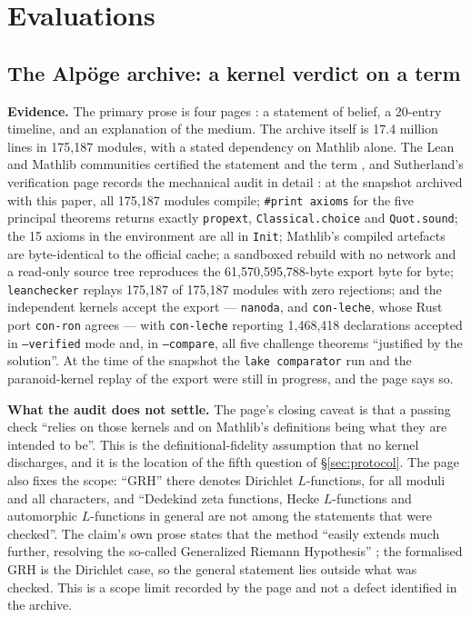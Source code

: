 \documentclass[11pt,a4paper]{article}
\begin{document}
\section{Evaluations}
\label{sec:evaluations}

\subsection{The Alp\"oge archive: a kernel verdict on a term}
\label{sec:alpoge}

\textbf{Evidence.} The primary prose is four pages \cite{alpoge}: a statement of belief, a
20-entry timeline, and an explanation of the medium. The archive itself is 17.4 million lines
in 175{,}187 modules, with a stated dependency on Mathlib alone. The Lean and Mathlib
communities certified the statement and the term \cite{leanmathlib}, and Sutherland's
verification page records the mechanical audit in detail \cite{sutherland}: at the snapshot
archived with this paper, all 175{,}187 modules compile; \texttt{\#print axioms} for the five
principal theorems returns exactly \texttt{propext}, \texttt{Classical.choice} and
\texttt{Quot.sound}; the 15 axioms in the environment are all in \texttt{Init}; Mathlib's
compiled artefacts are byte-identical to the official cache; a sandboxed rebuild with no
network and a read-only source tree reproduces the 61{,}570{,}595{,}788-byte export byte for
byte; \texttt{leanchecker} replays 175{,}187 of 175{,}187 modules with zero rejections; and the
independent kernels accept the export --- \texttt{nanoda}, and \texttt{con-leche}, whose Rust port
\texttt{con-ron} agrees --- with \texttt{con-leche} reporting 1{,}468{,}418 declarations accepted in
\texttt{--verified} mode and, in \texttt{--compare}, all five challenge theorems ``justified by the
solution''. At the time of the snapshot the \texttt{lake comparator} run and the paranoid-kernel
replay of the export were still in progress, and the page says so.

\textbf{What the audit does not settle.} The page's closing caveat is that a passing
check ``relies on those kernels and on Mathlib's definitions being what they are intended to be''.
This is the definitional-fidelity assumption that no kernel discharges, and it is the location of
the fifth question of \S\ref{sec:protocol}. The page also fixes the scope: ``GRH'' there denotes
Dirichlet $L$-functions, for all moduli and all characters, and ``Dedekind zeta functions, Hecke
$L$-functions and automorphic $L$-functions in general are not among the statements that were
checked''. The claim's own prose states that the method ``easily extends much further, resolving
the so-called Generalized Riemann Hypothesis'' \cite{alpoge}; the formalised GRH is the Dirichlet
case, so the general statement lies outside what was checked. This is a scope limit recorded by the
page and not a defect identified in the archive.
\end{document}
